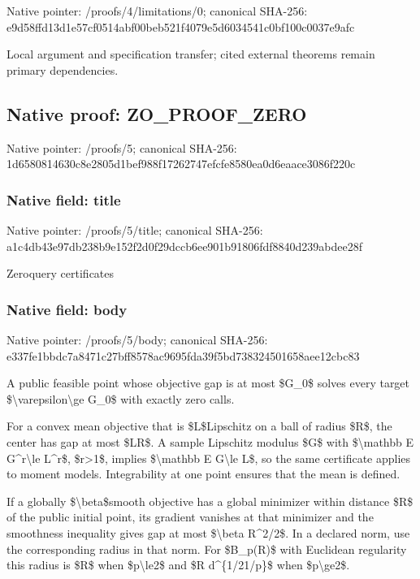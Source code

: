 \documentclass[10pt,a4paper]{article}
\begin{document}
Native pointer: /proofs/4/limitations/0; canonical SHA-256: e9d58ffd13d1e57cf0514abf\allowbreak{}00beb521f4079e5d6034541c\allowbreak{}0bf100c0037e9afc


Local argument and specification transfer; cited external theorems remain primary dependencies.


\subsection{Native proof: ZO\_PROOF\_ZERO}


Native pointer: /proofs/5; canonical SHA-256: 1d6580814630c8e2805d1bef\allowbreak{}988f17262747efcfe8580ea0\allowbreak{}d6eaace3086f220c



\subsubsection{Native field: title}


Native pointer: /proofs/5/title; canonical SHA-256: a1c4db43e97db238b9e152f2\allowbreak{}d0f29dccb6ee901b91806fdf\allowbreak{}8840d239abdee28f


Zeroquery certificates


\subsubsection{Native field: body}


Native pointer: /proofs/5/body; canonical SHA-256: e337fe1bbdc7a8471c27bff8\allowbreak{}578ac9695fda39f5bd738324\allowbreak{}501658aee12cbc83


A public feasible point whose objective gap is at most \$G\_0\$ solves every target \$\textbackslash{}varepsilon\textbackslash{}ge G\_0\$ with exactly zero calls.

For a convex mean objective that is \$L\$Lipschitz on a ball of radius \$R\$, the center has gap at most \$LR\$. A sample Lipschitz modulus \$G\$ with \$\textbackslash{}mathbb E G\textasciicircum{}r\textbackslash{}le L\textasciicircum{}r\$, \$r>1\$, implies \$\textbackslash{}mathbb E G\textbackslash{}le L\$, so the same certificate applies to moment models. Integrability at one point ensures that the mean is defined.

If a globally \$\textbackslash{}beta\$smooth objective has a global minimizer within distance \$R\$ of the public initial point, its gradient vanishes at that minimizer and the smoothness inequality gives gap at most \$\textbackslash{}beta R\textasciicircum{}2/2\$. In a declared norm, use the corresponding radius in that norm. For \$B\_p(R)\$ with Euclidean regularity this radius is \$R\$ when \$p\textbackslash{}le2\$ and \$R d\textasciicircum{}\{1/21/p\}\$ when \$p\textbackslash{}ge2\$.
\end{document}
